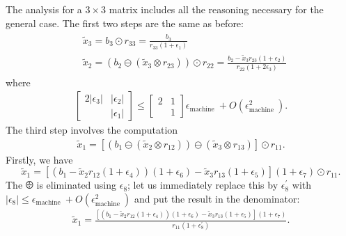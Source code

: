 The analysis for a $3\times 3$ matrix includes all the reasoning necessary for the general case. The first two steps are the same as before:  
\begin{align*}
\begin{aligned}
& \tilde{x}_3=b_3 \odot r_{33}=\frac{b_3}{r_{33}\left(1+\epsilon_1\right)} \\
& \tilde{x}_2=\left(b_2 \ominus\left(\tilde{x}_3 \otimes r_{23}\right)\right) \odot r_{22}=\frac{b_2-\tilde{x}_3 r_{23}\left(1+\epsilon_2\right)}{r_{22}\left(1+2 \epsilon_3\right)}
\end{aligned}
\end{align*}
where
\begin{align*}
\left[\begin{array}{cc}
2\left|\epsilon_3\right| & \left|\epsilon_2\right| \\
& \left|\epsilon_1\right|
\end{array}\right] \leq\left[\begin{array}{ll}
2 & 1 \\
& 1
\end{array}\right] \epsilon_{\text {machine }}+O\left(\epsilon_{\text {machine }}^2\right) .
\end{align*}
The third step involves the computation
\begin{align*}
\tilde{x}_1=\left[\left(b_1 \ominus\left(\tilde{x}_2 \otimes r_{12}\right)\right) \ominus\left(\tilde{x}_3 \otimes r_{13}\right)\right] \odot r_{11} .
\end{align*}
Firstly, we have 
\[
    \tilde{x}_1=\left[\left(b_1-\tilde{x}_2 r_{12}\left(1+\epsilon_4\right)\right)\left(1+\epsilon_6\right)-\tilde{x}_3 r_{13}\left(1+\epsilon_5\right)\right]\left(1+\epsilon_7\right) \odot r_{11} .
\]
The $\odiv$ is eliminated using $\epsilon_8$; let us immediately replace this by $\epsilon_8^{\prime}$ with $\left|\epsilon_8\right| \leq \epsilon_{\text {machine }}+O\left(\epsilon_{\text {machine }}^2\right)$ and put the result in the denominator:
\begin{align*}
\tilde{x}_1=\frac{\left[\left(b_1-\tilde{x}_2 r_{12}\left(1+\epsilon_4\right)\right)\left(1+\epsilon_6\right)-\tilde{x}_3 r_{13}\left(1+\epsilon_5\right)\right]\left(1+\epsilon_7\right)}{r_{11}\left(1+\epsilon_8^{\prime}\right)}.
\end{align*}


